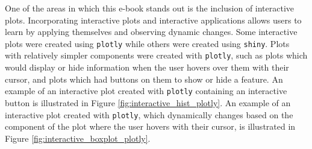 \documentclass[11pt]{article}
\begin{document}
%
%


One of the areas in which this e-book stands out is the inclusion of interactive plots.
Incorporating interactive plots and interactive applications allows users to learn by applying themselves and observing dynamic changes.
Some interactive plots were created using \texttt{plotly} while others were created using \texttt{shiny}. 
Plots with relatively simpler components were created with \texttt{plotly}, 
such as plots which would display or hide information when the user hovers over them with their cursor,
and plots which had buttons on them to show or hide a feature.
An example of an interactive plot created with \texttt{plotly} containing an interactive button is illustrated in Figure \ref{fig:interactive_hist_plotly}.
An example of an interactive plot created with \texttt{plotly}, which dynamically changes based on the component of the plot where the user hovers with their cursor, is illustrated in Figure \ref{fig:interactive_boxplot_plotly}.
\end{document}
